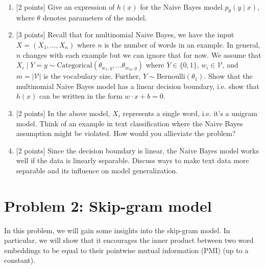 \documentclass{article}
\theoremstyle{case}
\theoremstyle{definition}
\newcommand{\recall}[1]{\noindent{[\textbf{RECALL:} #1]}}
\begin{document}
\begin{enumerate}
    \item {[2 points]} Give an expression of $h(x)$ for the Naive Bayes model $p_\theta(y\mid x)$, where $\theta$ denotes parameters of the model.
    

    \newpage
\item {[3 points]} Recall that for multinomial Naive Bayes,
        we have the input $X=(X_1, \ldots, X_n)$ where $n$ is the number of words in an example.
        In general, $n$ changes with each example but we can ignore that for now.
        We assume that $X_i\mid Y=y \sim \text{Categorical}(\theta_{w_1,y}, \ldots \theta_{w_m,y})$ where $Y\in \{0, 1\}$, $w_i\in\mathcal{V}$, and $m=|\mathcal{V}|$ is the vocabulary size.
        Further, $Y\sim\text{Bernoulli}(\theta_1)$.
        Show that the multinomial Naive Bayes model has a linear decision boundary,
        i.e. show that $h(x)$ can be written in the form $w\cdot x + b=0$.
        \recall{
            The categorical distribution is a multinomial distribution with one trial.
            Its PMF is
            $$
            p(x_1,\ldots, x_m) = \prod_{i=1}^m\theta_{i}^{x_i} \;,
            $$
            where $x_i = \mathbbm{1}[x=i]$, $\sum_{i=1}^m x_i = 1$,
            and $\sum_{i=1}^m \theta_i = 1$.
        }
 
    \newpage
\item {[2 points]} In the above model, $X_i$ represents a single word, i.e. it's a unigram model.
    Think of an example in text classification where the Naive Bayes assumption might be violated.
    How would you allieviate the problem?


\item {[2 points]} Since the decision boundary is linear, the Naive Bayes model works well if the data is linearly separable.
        Discuss ways to make text data more separable and its influence on model generalization.


\newpage
\end{enumerate}

\section*{Problem 2: Skip-gram model}
In this problem, we will gain some insights into the skip-gram model.
In particular, we will show that it
encourages the inner product between two word embeddings
to be equal to their pointwise mutual information (PMI) (up to a constant).
\end{document}
